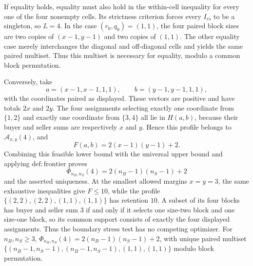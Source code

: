 If equality holds, equality must also hold in the within-cell inequality for every one of the four nonempty cells.  Its strictness criterion forces every \(I_{rs}\) to be a singleton, so \(L=4\).  In the case \((r_0,q_0)=(1,1)\), the four paired block sizes are two copies of \((x-1,y-1)\) and two copies of \((1,1)\).  The other equality case merely interchanges the diagonal and off-diagonal cells and yields the same paired multiset.  Thus this multiset is necessary for equality, modulo a common block permutation.

Conversely, take
\[
 a=(x-1,x-1,1,1),\qquad b=(y-1,y-1,1,1),
\]
with the coordinates paired as displayed.  These vectors are positive and have totals \(2x\) and \(2y\).  The four assignments selecting exactly one coordinate from \(\{1,2\}\) and exactly one coordinate from \(\{3,4\}\) all lie in \(H(a,b)\), because their buyer and seller sums are respectively \(x\) and \(y\).  Hence this profile belongs to \(\mathcal A_{x,y}(4)\), and
\[
 F(a,b)=2(x-1)(y-1)+2.
\]
Combining this feasible lower bound with the universal upper bound and applying \(\mathrm{def{:}frontier}\) proves
\[
 \Phi_{n_B,n_S}(4)=2(n_B-1)(n_S-1)+2
\]
and the asserted uniqueness.  At the smallest allowed margins \(x=y=3\), the same exhaustive inequalities give \(F\le10\), while the profile \(\{(2,2),(2,2),(1,1),(1,1)\}\) has retention \(10\).  A subset of its four blocks has buyer and seller sum \(3\) if and only if it selects one size-two block and one size-one block, so its common support consists of exactly the four displayed assignments.  Thus the boundary stress test has no competing optimizer.
For \(n_B,n_S\ge3\), \(\Phi_{n_B,n_S}(4)=2(n_B-1)(n_S-1)+2\), with unique paired multiset \(\{(n_B-1,n_S-1),(n_B-1,n_S-1),(1,1),(1,1)\}\) modulo block permutation.
